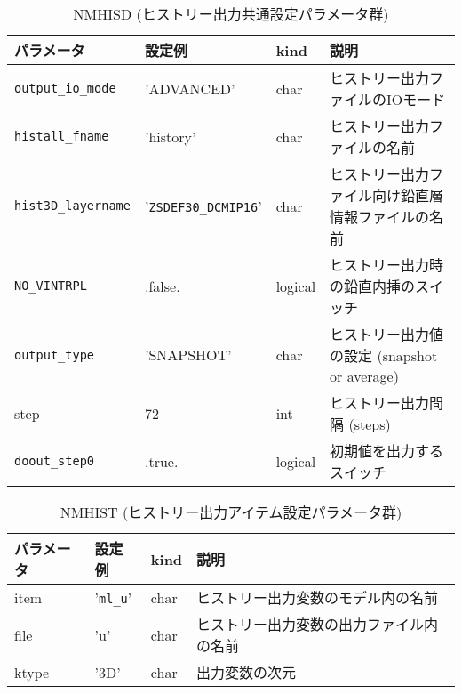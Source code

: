 \begin{table}[htb]
\begin{center}
\caption{NMHISD (ヒストリー出力共通設定パラメータ群)}
\begin{tabularx}{150mm}{|l|l|l|X|} \hline
 \rowcolor[gray]{0.9} パラメータ & 設定例 & kind & 説明          \\ \hline
 \verb|output_io_mode|   & 'ADVANCED' & char    & ヒストリー出力ファイルのIOモード \\ \hline
 \verb|histall_fname|    & 'history'  & char    & ヒストリー出力ファイルの名前 \\ \hline
 \verb|hist3D_layername| & '\verb|ZSDEF30_DCMIP16|' & char & ヒストリー出力ファイル向け鉛直層情報ファイルの名前 \\ \hline
 \verb|NO_VINTRPL|       & .false.    & logical & ヒストリー出力時の鉛直内挿のスイッチ \\ \hline
 \verb|output_type|      & 'SNAPSHOT' & char    & ヒストリー出力値の設定 (snapshot or average) \\ \hline
 step             & 72         & int     & ヒストリー出力間隔 (steps) \\ \hline
 \verb|doout_step0|      & .true.     & logical & 初期値を出力するスイッチ \\ \hline
\end{tabularx}
\end{center}
\end{table}

\begin{table}[t]
\begin{center}
\caption{NMHIST (ヒストリー出力アイテム設定パラメータ群)}
\begin{tabularx}{150mm}{|l|l|l|X|} \hline
 \rowcolor[gray]{0.9} パラメータ & 設定例 & kind & 説明          \\ \hline
 item  & '\verb|ml_u|' & char & ヒストリー出力変数のモデル内の名前 \\ \hline
 file  & 'u'    & char & ヒストリー出力変数の出力ファイル内の名前 \\ \hline
 ktype & '3D'   & char & 出力変数の次元 \\ \hline
\end{tabularx}
\end{center}
\end{table}

